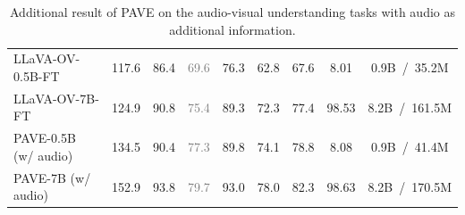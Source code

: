 \begin{table}[t]
{\begin{tabular}{lc|c|cccc|c|c}
     LLaVA-OV-0.5B-FT                                             & 117.6  & 86.4 & \textcolor{gray}{69.6} & 76.3 & 62.8 &  67.6  & 8.01 & 0.9B~/~35.2M \\
     LLaVA-OV-7B-FT                                               & 124.9  & 90.8 & \textcolor{gray}{75.4} & 89.3 & 72.3 &  77.4  & 98.53 & 8.2B~/~161.5M \\
     \midrule
     
     PAVE-0.5B (w/ audio)                                          & 134.5 &  90.4  & \textcolor{gray}{77.3} & 89.8  & 74.1 & 78.8 & 8.08 & 0.9B~/~41.4M   \\
     PAVE-7B   (w/ audio)                                          & 152.9 & 93.8 & \textcolor{gray}{79.7} & 93.0 & 78.0 &  82.3 & 98.63 & 8.2B~/~170.5M \\ \bottomrule

\end{tabular}
}


\caption{Additional result of PAVE on the audio-visual understanding tasks with audio as additional information. 
\vspace{-1mm}
}  
\label{tab:video_audio_understanding_appendix}  
\end{table}  

